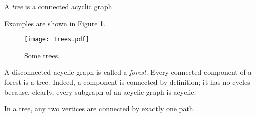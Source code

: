\begin{page}
\setcounter{section}{2}
\setcounter{subsection}{1}
\setcounter{dfn}{1}
\label{portion:210}

\begin{dfn}
A \emph{tree} is a connected acyclic graph.
\end{dfn}

\end{page}

\begin{page}
\setcounter{section}{2}
\setcounter{subsection}{1}
\setcounter{dfn}{1}
\label{portion:211}

Examples are shown in Figure \ref{fig:Trees}.

\begin{figure}[ht]
\begin{center}
\texttt{[image: Trees.pdf]}
\end{center}
\caption{Some trees.}
\label{fig:Trees}
\end{figure}

A disconnected acyclic graph is called a \emph{forest}.
Every connected component of a forest is a tree.
Indeed, a component is connected by definition; it has no cycles because, clearly, every subgraph of an acyclic graph is acyclic.


\end{page}

\begin{page}
\setcounter{section}{2}
\setcounter{subsection}{1}
\setcounter{dfn}{2}
\label{portion:213}

\begin{thm}
In a tree, any two vertices are connected by exactly one path.
\end{thm}

\end{page}

